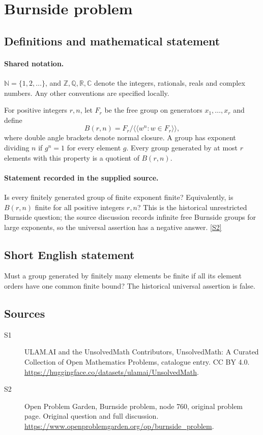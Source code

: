 \documentclass[11pt]{article}
\newcommand{\sref}[2]{\hyperlink{source:#1:#2}{[S#2]}}
\begin{document}
\section{Burnside problem}\label{statement}

\subsection{Definitions and mathematical statement}

\paragraph{Shared notation.}$\mathbb N=\{1,2,\ldots\}$, and $\mathbb Z,\mathbb Q,\mathbb R,\mathbb C$ denote the integers, rationals, reals and complex numbers. Any other conventions are specified locally.


For positive integers $r,n$, let $F_r$ be the free group on generators $x_1,\ldots,x_r$ and define\[ B(r,n)=F_r/\langle\!\langle w^n:w\in F_r\rangle\!\rangle, \] where double angle brackets denote normal closure. A group has exponent dividing $n$ if $g^n=1$ for every element $g$. Every group generated by at most $r$ elements with this property is a quotient of $B(r,n)$.
\paragraph{Statement recorded in the supplied source.}
Is every finitely generated group of finite exponent finite? Equivalently, is $B(r,n)$ finite for all positive integers $r,n$? This is the historical unrestricted Burnside question; the source discussion records infinite free Burnside groups for large exponents, so the universal assertion has a negative answer. \sref{statement}{2}
\subsection{Short English statement}
Must a group generated by finitely many elements be finite if all its element orders have one common finite bound? The historical universal assertion is false.
\subsection{Sources}
\begin{description}
\item[\hypertarget{source:statement:1}{S1}] ULAM.AI and the UnsolvedMath Contributors, UnsolvedMath: A Curated Collection of Open Mathematics Problems, catalogue entry. CC BY 4.0. \url{https://huggingface.co/datasets/ulamai/UnsolvedMath}.
\item[\hypertarget{source:statement:2}{S2}] Open Problem Garden, Burnside problem, node 760, original problem page. Original question and full discussion. \url{https://www.openproblemgarden.org/op/burnside_problem}.

\end{description}
\label{end:statement}
\end{document}
